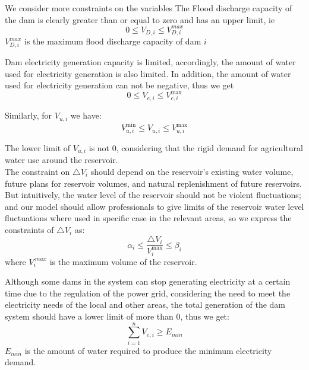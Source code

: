 \documentclass{mcmthesis}
\begin{document}
We consider more constraints on the variables
The Flood discharge capacity of the dam is clearly greater than or equal to zero and has an upper limit, ie
\begin{equation}
0 \leq V_{D, i} \leq V_{D, i}^{max}
\end{equation}
$ V_{D, i} ^ {max} $ is the maximum flood discharge capacity of dam $i$

Dam electricity generation capacity is limited, accordingly, the amount of water used for electricity generation is also limited. In addition, the amount of water used for electricity generation can not be negative, thus we get
\begin{equation}
0 \leq V_{e, i} \leq V_{e, i}^{\max}
\end{equation}

Similarly, for $ V_ {u, i} $ we have:
\begin{equation}
V_{u, i}^{\min} \leq V_{u, i} \leq V_{u, i}^{\max}
\end{equation}

\indent The lower limit of $ V_ {u, i} $ is not $ 0 $, considering that the rigid demand for agricultural water use around the reservoir.\\
\indent The constraint on $ \triangle V_ {i} $ should depend on the reservoir's existing water volume, future plans for reservoir volumes, and natural replenishment of future reservoirs. But intuitively, the water level of the reservoir should not be violent fluctuations; and our model should allow professionals to give limits of the reservoir water level fluctuations where used in specific case in the relevant areas, so we express the constraints of $ \triangle V_ {i} $ as:
\begin{equation}
\alpha_{i} \leq \frac{\triangle V_{i}}{V_{i}^{\max}} \leq \beta_{i}
\end{equation}
where $ V_ {i} ^ {\ max} $ is the maximum volume of the reservoir.

\indent Although some dams in the system can stop generating electricity at a certain time due to the regulation of the power grid, considering the need to meet the electricity needs of the local and other areas, the total generation of the dam system should have a lower limit of more than $ 0 $, thus we get:
\begin{equation}
\sum_{i = 1}^{n} V_{e, i} \geq E_{min}
\end{equation}
$ E_ {min} $ is the amount of water required to produce the minimum electricity demand.
\end{document}
